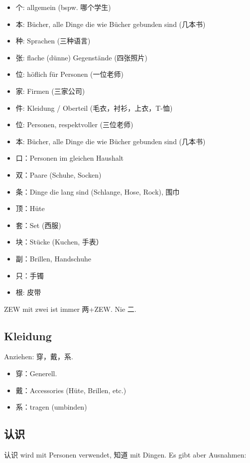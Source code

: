 \documentclass[UTF8]{ctexart}
\begin{document}
\begin{itemize}
    \item 个: allgemein (bspw. 哪个学生)
    \item 本: Bücher, alle Dinge die wie Bücher gebunden sind (几本书)
    \item 种: Sprachen (三种语言)
    \item 张: flache (dünne) Gegenstände (四张照片)
    \item 位: höflich für Personen (一位老师)
    \item 家: Firmen (三家公司)
    \item 件: Kleidung / Oberteil (毛衣，衬衫，上衣，T-恤)
    \item 位: Personen, respektvoller (三位老师)
    \item 本: Bücher, alle Dinge die wie Bücher gebunden sind (几本书)
    \item 口：Personen im gleichen Haushalt
    \item 双：Paare (Schuhe, Socken)
    \item 条：Dinge die lang sind (Schlange, Hose, Rock), 围巾
    \item 顶：Hüte
    \item 套：Set (西服)
    \item 块：Stücke (Kuchen, 手表）
    \item 副：Brillen, Handschuhe
    \item 只：手镯
    \item 根: 皮带
\end{itemize}

ZEW mit zwei ist immer 两+ZEW. Nie 二.

\subsection{Kleidung}

Anziehen: 穿，戴，系.

\begin{itemize}
    \item 穿：Generell.
    \item 戴：Accessories (Hüte, Brillen, etc.)
    \item 系：tragen (umbinden)
\end{itemize}

\subsection{认识}

认识 wird mit Personen verwendet, 知道 mit Dingen. Es gibt aber Ausnahmen:
\end{document}
